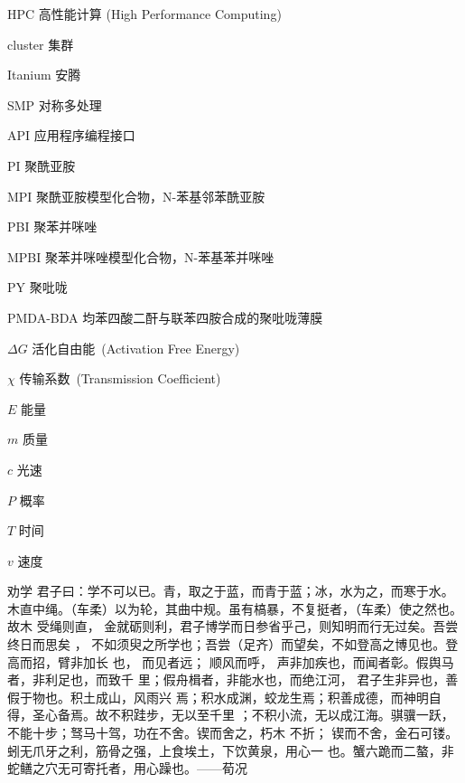 \begin{denotation}

\item[HPC] 高性能计算 (High Performance Computing)
\item[cluster] 集群
\item[Itanium] 安腾
\item[SMP] 对称多处理
\item[API] 应用程序编程接口
\item[PI]	聚酰亚胺
\item[MPI]	聚酰亚胺模型化合物，N-苯基邻苯酰亚胺
\item[PBI]	聚苯并咪唑
\item[MPBI]	聚苯并咪唑模型化合物，N-苯基苯并咪唑
\item[PY]	聚吡咙
\item[PMDA-BDA]	均苯四酸二酐与联苯四胺合成的聚吡咙薄膜
\item[$\Delta G$]  	活化自由能~(Activation Free Energy)
\item [$\chi$] 传输系数~(Transmission Coefficient)
\item[$E$] 能量
\item[$m$] 质量
\item[$c$] 光速
\item[$P$] 概率
\item[$T$] 时间
\item[$v$] 速度
\item[劝学] 君子曰：学不可以已。青，取之于蓝，而青于蓝；冰，水为之，而寒于水。
木直中绳。（车柔）以为轮，其曲中规。虽有槁暴，不复挺者，（车柔）使之然也。故木
受绳则直， 金就砺则利，君子博学而日参省乎己，则知明而行无过矣。吾尝终日而思矣
，  不如须臾之所学也；吾尝（足齐）而望矣，不如登高之博见也。登高而招，臂非加长
也，  而见者远；  顺风而呼，  声非加疾也，而闻者彰。假舆马者，非利足也，而致千
里；假舟楫者，非能水也，而绝江河，  君子生非异也，善假于物也。积土成山，风雨兴
焉；积水成渊，蛟龙生焉；积善成德，而神明自得，圣心备焉。故不积跬步，无以至千里
；不积小流，无以成江海。骐骥一跃，不能十步；驽马十驾，功在不舍。锲而舍之，朽木
不折；  锲而不舍，金石可镂。蚓无爪牙之利，筋骨之强，上食埃土，下饮黄泉，用心一
也。蟹六跪而二螯，非蛇鳝之穴无可寄托者，用心躁也。——荀况
\end{denotation}
